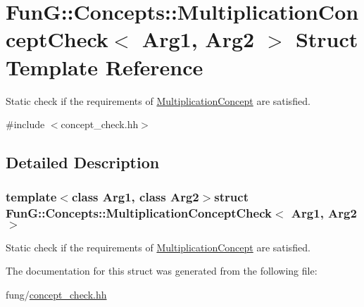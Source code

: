 \hypertarget{structFunG_1_1Concepts_1_1MultiplicationConceptCheck}{\section{Fun\-G\-:\-:Concepts\-:\-:Multiplication\-Concept\-Check$<$ Arg1, Arg2 $>$ Struct Template Reference}
\label{structFunG_1_1Concepts_1_1MultiplicationConceptCheck}
}


Static check if the requirements of \hyperlink{structFunG_1_1Concepts_1_1MultiplicationConcept}{Multiplication\-Concept} are satisfied.  




{\ttfamily \#include $<$concept\-\_\-check.\-hh$>$}



\subsection{Detailed Description}
\subsubsection*{template$<$class Arg1, class Arg2$>$struct Fun\-G\-::\-Concepts\-::\-Multiplication\-Concept\-Check$<$ Arg1, Arg2 $>$}

Static check if the requirements of \hyperlink{structFunG_1_1Concepts_1_1MultiplicationConcept}{Multiplication\-Concept} are satisfied. 

The documentation for this struct was generated from the following file\-:\begin{DoxyCompactItemize}
\item 
fung/\hyperlink{concept__check_8hh}{concept\-\_\-check.\-hh}\end{DoxyCompactItemize}
